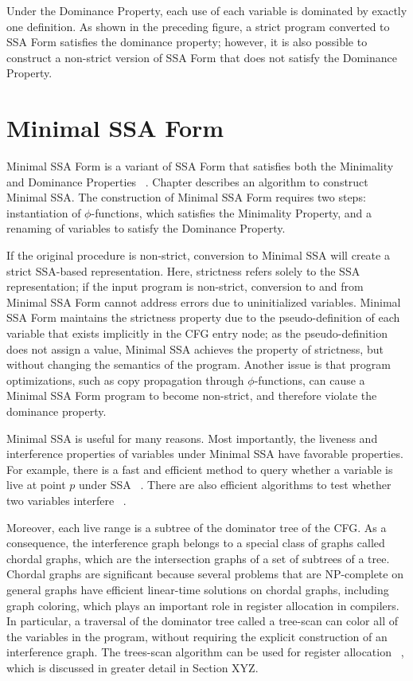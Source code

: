 Under the Dominance Property, each use of each variable is dominated
by exactly one definition. As shown in the preceding figure, a strict
program converted to SSA Form satisfies the dominance property;
however, it is also possible to construct a non-strict version of SSA
Form that does not satisfy the Dominance Property.  

\section{Minimal SSA Form}

Minimal SSA Form is a variant of SSA Form that satisfies both the 
Minimality and Dominance Properties ~\cite{CytronOct91}. Chapter
\label{chap:classical_construction} describes an algorithm to
construct Minimal SSA. The construction of Minimal SSA Form
requires two steps: instantiation of $\phi$-functions, which
satisfies the Minimality Property, and a renaming of variables
to satisfy the Dominance Property. 

If the original procedure is non-strict, conversion to Minimal SSA
will create a strict SSA-based representation. Here, strictness refers
solely to the SSA representation; if the input program is non-strict,
conversion to and from Minimal SSA Form cannot address errors due
to uninitialized variables. Minimal SSA Form maintains the strictness
property due to the pseudo-definition of each variable that exists
implicitly in the CFG entry node; as the pseudo-definition does not
assign a value, Minimal SSA achieves the property of strictness, but
without changing the semantics of the program. Another issue is
that program optimizations, such as copy propagation through
$\phi$-functions, can cause a Minimal SSA Form program to
become non-strict, and therefore violate the dominance property.

Minimal SSA is useful for many reasons. Most importantly, the liveness
and interference properties of variables under Minimal SSA have favorable
properties. For example, there is a fast and efficient method to query whether
a variable is live at point $p$ under SSA ~\cite{BoissinotApr08}. 
There are also efficient algorithms to test whether two variables interfere
~\cite{BudimlicJun02, BoissinotApr09}. 

Moreover, each live range is a subtree of the dominator tree of the CFG. 
As a consequence, the interference graph belongs to a special class of
graphs called chordal graphs, which are the intersection graphs of a set
of subtrees of a tree. Chordal graphs are significant because several
problems that are NP-complete on general graphs have efficient linear-time
solutions on chordal graphs, including graph coloring, which plays
an important role in register allocation in compilers. In particular,
a traversal of the dominator tree called a tree-scan can color all of
the variables in the program, without requiring the explicit construction
of an interference graph. The trees-scan algorithm can be used
for register allocation ~\cite{ColumbetOct11}, which is discussed
in greater detail in Section XYZ. 


